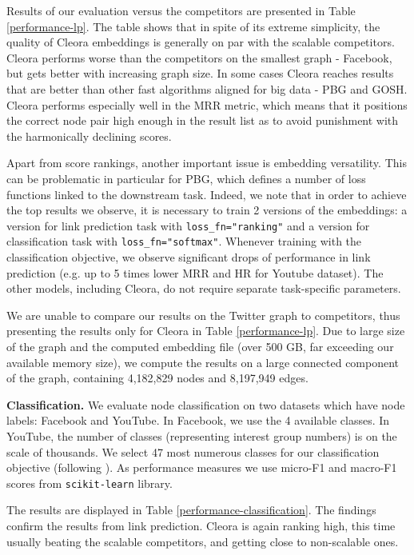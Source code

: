 \documentclass{IEEEtran}
\begin{document}
Results of our evaluation versus the competitors are presented in Table \ref{performance-lp}. The table shows that in spite of its extreme simplicity, the quality of Cleora embeddings is generally on par with the scalable competitors. Cleora performs worse than the competitors on the smallest graph - Facebook, but gets better with increasing graph size. In some cases Cleora reaches results that are better than other fast algorithms aligned for big data - PBG and GOSH. Cleora performs especially well in the MRR metric, which means that it positions the correct node pair high enough in the result list as to avoid punishment with the harmonically declining scores.

Apart from score rankings, another important issue is embedding versatility. This can be problematic in particular for PBG, which defines a number of loss functions linked to the downstream task. Indeed, we note that in order to achieve the top results we observe, it is necessary to train 2 versions of the embeddings: a version for link prediction task with \texttt{loss\_fn="ranking"} and a version for classification task with \texttt{loss\_fn="softmax"}. Whenever training with the classification objective, we observe significant drops of performance in link prediction (e.g. up to 5 times lower MRR and HR for Youtube dataset). The other models, including Cleora, do not require separate task-specific parameters.

We are unable to compare our results on the Twitter graph to competitors, thus presenting the results only for Cleora in Table \ref{performance-lp}. Due to large size of the graph and the computed embedding file (over 500 GB, far exceeding our available memory size), we compute the results on a large connected component of the graph, containing 4,182,829 nodes and 8,197,949 edges.

\textbf{Classification.} We evaluate node classification on two datasets which have node labels: Facebook and YouTube. In Facebook, we use the 4 available classes. In YouTube, the number of classes (representing interest group numbers) is on the scale of thousands. We select 47 most numerous classes for our classification objective (following \cite{tang2015line}). As performance measures we use micro-F1 and macro-F1 scores from \texttt{scikit-learn} library.

The results are displayed in Table \ref{performance-classification}. The findings confirm the results from link prediction. Cleora is again ranking high, this time usually beating the scalable competitors, and getting close to non-scalable ones.
\end{document}
